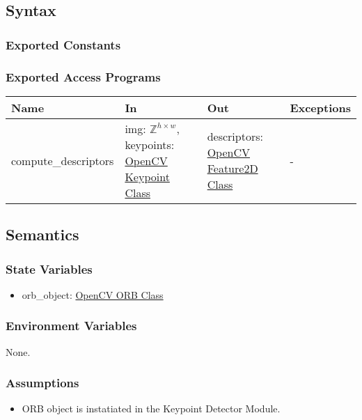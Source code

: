 \documentclass[12pt, titlepage]{article}
\begin{document}
\subsection{Syntax}

\subsubsection{Exported Constants}

\subsubsection{Exported Access Programs}

\begin{center}
\begin{tabular}{p{4cm} p{5cm} p{4cm} p{2cm}}
\hline
\textbf{Name} & \textbf{In} & \textbf{Out} & \textbf{Exceptions} \\
\hline
compute\_descriptors
& img: $\mathbb{Z}^{h \times w}$, \newline
keypoints: \href{https://docs.opencv.org/3.4/d2/d29/classcv_1_1KeyPoint.html}{OpenCV Keypoint Class}
& descriptors: \href{https://docs.opencv.org/4.x/d0/d13/classcv_1_1Feature2D.html}{OpenCV Feature2D Class}
& - \\
\hline
\end{tabular}
\end{center}

\subsection{Semantics}
\subsubsection{State Variables}
\begin{itemize}
\item orb\_object: \href{https://docs.opencv.org/3.4/db/d95/classcv_1_1ORB.html}{OpenCV ORB Class}
\end{itemize}


\subsubsection{Environment Variables}
None.

\subsubsection{Assumptions}
\begin{itemize}
\item ORB object is instatiated in the Keypoint Detector Module.
\end{itemize}
\end{document}

